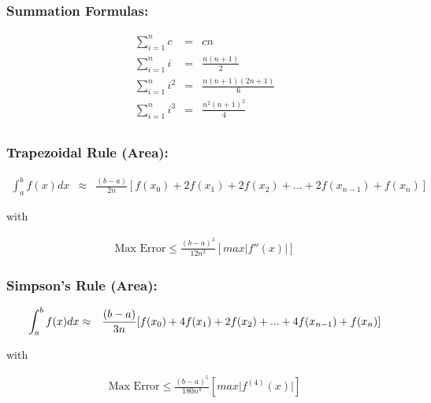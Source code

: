 \documentclass{article}[11pt]
\begin{document}
\large


\subsubsection*{\large{Summation Formulas:}}
\vspace{-0.25in}
\begin{eqnarray*}
\sum^n_{i=1}{c} &=& cn\\
\sum^n_{i=1}{i} &=& \frac{n(n+1)}{2}\\
\sum^n_{i=1}{i^2} &=& \frac{n(n+1)(2n+1)}{6}\\
\sum^n_{i=1}{i^3} &=& \frac{n^2(n+1)^2}{4}\\
\end{eqnarray*}
\vspace{0.15in}

\subsubsection*{\large{Trapezoidal Rule (Area):}}
\vspace{-0.05in}
\begin{eqnarray*}
\int_a^b{f(x)}dx & \approx & \frac{(b-a)}{2n}[f(x_0)+2f(x_1) + 2f(x_2) + ... + 2f(x_{n-1}) + f(x_n)] 
\end{eqnarray*}
\begin{center}
with 
\vspace{-0.05in}
\end{center}
\begin{eqnarray*}
\textrm{Max Error} \leq \frac{(b-a)^3}{12n^2}[ max \Big| f''(x) \Big| ]
\end{eqnarray*}
\vspace{0.15in}

\subsubsection*{\large{Simpson's Rule (Area):}}
\begin{eqnarray*}
\vspace{-0.05in}
\int_a^b{f(x)}dx & \approx & \frac{(b-a)}{3n}[f(x_0)+4f(x_1) + 2f(x_2) + ... + 4f(x_{n-1}) + f(x_n)] 
\end{eqnarray*}
\begin{center}
with 
\vspace{-0.05in}
\end{center}
\begin{eqnarray*}
\textrm{Max Error} \leq \frac{(b-a)^5}{180n^4}[ max \Big| f^{(4)}(x) \Big| ]
\end{eqnarray*}
\end{document}
